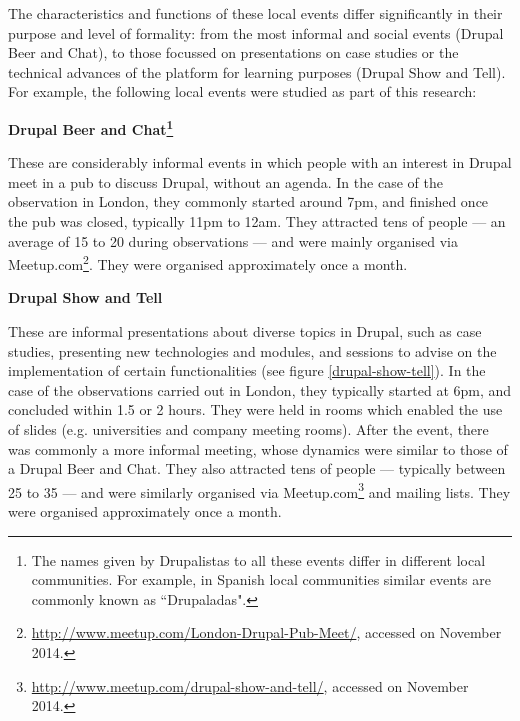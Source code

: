 The characteristics and functions of these local events differ significantly in their purpose and level of formality: from the most informal and social events (Drupal Beer and Chat), to those focussed on presentations on case studies or the technical advances of the platform for learning purposes (Drupal Show and Tell). For example, the following local events were studied as part of this research:

\textbf{Drupal Beer and Chat\footnote{The names given by Drupalistas to all these events differ in different local communities. For example, in Spanish local communities similar events are commonly known as ``Drupaladas".}}

These are considerably informal events in which people with an interest in Drupal meet in a pub to discuss Drupal, without an agenda. In the case of the observation in London, they commonly started around 7pm, and finished once the pub was closed, typically 11pm to 12am. They attracted tens of people --- an average of 15 to 20 during observations --- and were mainly organised via Meetup.com\footnote{\url{http://www.meetup.com/London-Drupal-Pub-Meet/}, accessed on  November 2014.}. They were organised approximately once a month.

\textbf{Drupal Show and Tell}

These are informal presentations about diverse topics in Drupal, such as case studies, presenting new technologies and modules, and sessions to advise on the implementation of certain functionalities (see figure \ref{drupal-show-tell}). In the case of the observations carried out in London, they typically started at 6pm, and concluded within 1.5 or 2 hours. They were held in rooms which enabled the use of slides (e.g. universities and company meeting rooms). After the event, there was commonly a more informal meeting, whose dynamics were similar to those of a Drupal Beer and Chat. They also attracted tens of people --- typically between 25 to 35 --- and were similarly organised via Meetup.com\footnote{\url{http://www.meetup.com/drupal-show-and-tell/}, accessed on  November 2014.}  and mailing lists. They were organised approximately once a month.

